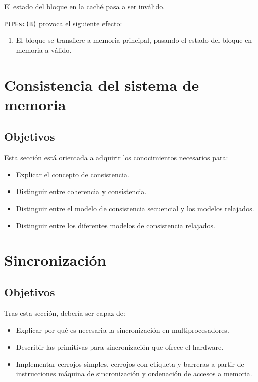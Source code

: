 \begin{description}
        El estado del bloque en la caché pasa a ser inválido.

        \verb|PtPEsc(B)| provoca el siguiente efecto:
        \begin{enumerate}
            \item El bloque se transfiere a memoria principal, pasando el estado del bloque en memoria a válido.
        \end{enumerate}
\end{description}




\newpage
\section{Consistencia del sistema de memoria}
\subsection{Objetivos}
Esta sección está orientada a adquirir los conocimientos necesarios para:
\begin{itemize}
    \item Explicar el concepto de consistencia.
    \item Distinguir entre coherencia y consistencia.
    \item Distinguir entre el modelo de consistencia secuencial y los modelos relajados.
    \item Distinguir entre los diferentes modelos de consistencia relajados.
\end{itemize}

\newpage
\section{Sincronización}
\subsection{Objetivos}
Tras esta sección, debería ser capaz de:
\begin{itemize}
    \item Explicar por qué es necesaria la sincronización en multiprocesadores.
    \item Describir las primitivas para sincronización que ofrece el hardware.
    \item Implementar cerrojos simples, cerrojos con etiqueta y barreras a partir de instrucciones máquina de sincronización y ordenación de accesos a memoria.
\end{itemize}
